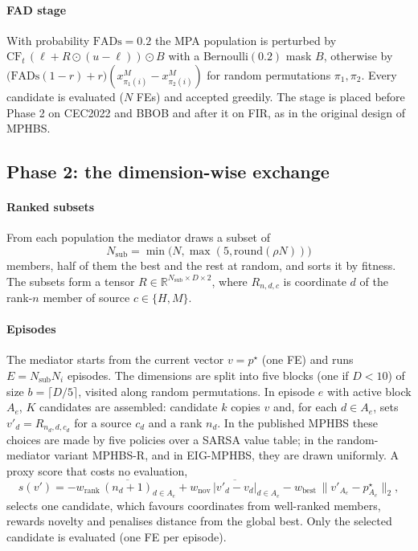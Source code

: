 \documentclass[preprint,12pt,authoryear]{elsarticle}
\theoremstyle{remark}
\begin{document}
\paragraph{FAD stage} With probability $\mathrm{FADs}=0.2$ the MPA population is perturbed by
$\mathrm{CF}_t\,(\ell + R\odot(u-\ell))\odot B$ with a Bernoulli$(0.2)$ mask $B$, otherwise by
$\bigl(\mathrm{FADs}(1-r)+r\bigr)(x^M_{\pi_1(i)}-x^M_{\pi_2(i)})$ for random permutations $\pi_1,\pi_2$. Every candidate
is evaluated ($N$ FEs) and accepted greedily. The stage is placed before Phase 2 on CEC2022 and BBOB and after it on FIR,
as in the original design of MPHBS.

\subsection{Phase 2: the dimension-wise exchange}
\label{sec:exchange}
\paragraph{Ranked subsets} From each population the mediator draws a subset of
\begin{equation}
N_\mathrm{sub}=\min\bigl(N,\max(5,\mathrm{round}(\rho N))\bigr)
\end{equation}
members, half of them the best and the rest at random, and sorts it by fitness. The subsets form a tensor $R\in\mathbb{R}^{N_\mathrm{sub}\times D\times 2}$, where $R_{n,d,c}$ is
coordinate $d$ of the rank-$n$ member of source $c\in\{H,M\}$.

\paragraph{Episodes} The mediator starts from the current vector $v=p^\star$ (one FE) and runs $E=N_\mathrm{sub}N_i$
episodes. The dimensions are split into five blocks (one if $D<10$) of size $b=\lceil D/5\rceil$, visited along random
permutations. In episode $e$ with active block $A_e$, $K$ candidates are assembled: candidate $k$ copies $v$ and, for
each $d\in A_e$, sets $v'_d=R_{n_d,d,c_d}$ for a source $c_d$ and a rank $n_d$. In the published MPHBS these choices are
made by five policies over a SARSA value table; in the random-mediator variant MPHBS-R, and in EIG-MPHBS, they are drawn
uniformly. A proxy score that costs no evaluation,
\begin{equation}
s(v') = -w_\mathrm{rank}\,\overline{(n_d+1)}_{d\in A_e} + w_\mathrm{nov}\,\overline{|v'_d-v_d|}_{d\in A_e}
        - w_\mathrm{best}\,\|v'_{A_e}-p^\star_{A_e}\|_2,
\label{eq:proxy}
\end{equation}
selects one candidate, which favours coordinates from well-ranked members, rewards novelty and penalises distance from
the global best. Only the selected candidate is evaluated (one FE per episode).
\end{document}
